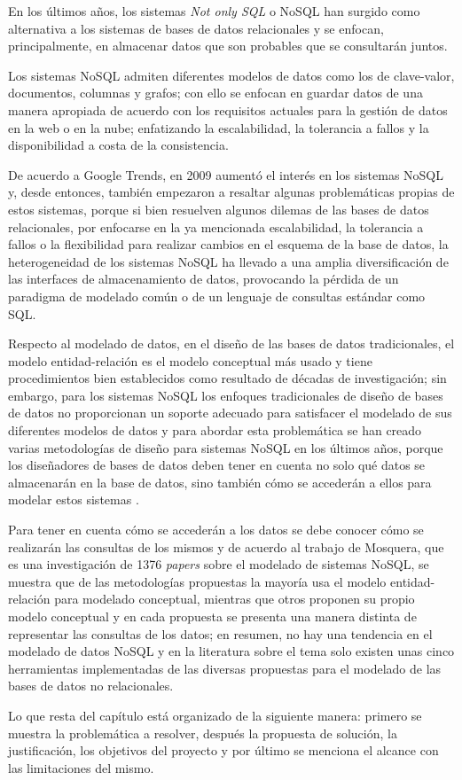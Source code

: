 En los últimos años, los sistemas \textit{Not only SQL} o NoSQL han surgido como alternativa a los sistemas de bases de datos relacionales y se enfocan, principalmente, en almacenar datos que son probables que se consultarán juntos.


Los sistemas NoSQL admiten diferentes modelos de datos como los de clave-valor, documentos, columnas y grafos; con ello se enfocan en guardar datos de una manera apropiada de acuerdo con los requisitos actuales para la gestión de datos en la web o en la nube; enfatizando la escalabilidad, la tolerancia a fallos y la disponibilidad a costa de la consistencia.



De acuerdo a Google Trends\cite{google_google_2020}, en 2009 aumentó el interés en los sistemas NoSQL y, desde entonces, también empezaron a resaltar algunas problemáticas propias de estos sistemas, porque si bien resuelven algunos dilemas de las bases de datos relacionales, por enfocarse en la ya mencionada escalabilidad, la tolerancia a fallos o la flexibilidad para realizar cambios en el esquema de la base de datos, la heterogeneidad de los sistemas NoSQL ha llevado a una amplia diversificación de las interfaces de almacenamiento de datos, provocando la pérdida de un paradigma de modelado común o de un lenguaje de consultas estándar como SQL.


Respecto al modelado de datos, en el diseño de las bases de datos tradicionales, el modelo entidad-relación\cite{codd_relational_nodate} es el modelo conceptual más usado y tiene procedimientos bien establecidos como resultado de décadas de investigación; sin embargo, para los sistemas NoSQL los enfoques tradicionales de diseño de bases de datos no proporcionan un soporte adecuado para satisfacer el modelado de sus diferentes modelos de datos y para abordar esta problemática se han creado varias metodologías de diseño para sistemas NoSQL en los últimos años, porque los diseñadores de bases de datos deben tener en cuenta no solo qué datos se almacenarán en la base de datos, sino también cómo se accederán a ellos para modelar estos sistemas \cite{li_transforming_2010,chebotko_big_2015,mior_nose_2017}. 


Para tener en cuenta cómo se accederán a los datos se debe conocer cómo se realizarán las consultas de los mismos y de acuerdo al trabajo de Mosquera\cite{martinez-mosquera_modeling_2020}, que es una investigación de 1376 \textit{papers} sobre el modelado de sistemas NoSQL, se muestra que de las metodologías propuestas la mayoría usa el modelo entidad-relación para modelado conceptual, mientras que otros proponen su propio modelo conceptual y en cada propuesta se presenta una manera distinta de representar las consultas de los datos; en resumen, no hay una tendencia en el modelado de datos NoSQL y en la literatura sobre el tema solo existen unas cinco herramientas implementadas de las diversas propuestas para el modelado de las bases de datos no relacionales.



Lo que resta del capítulo está organizado de la siguiente manera: primero se muestra la problemática a resolver, después la propuesta de solución, la justificación, los objetivos del proyecto y por último se menciona el alcance con las limitaciones del mismo.